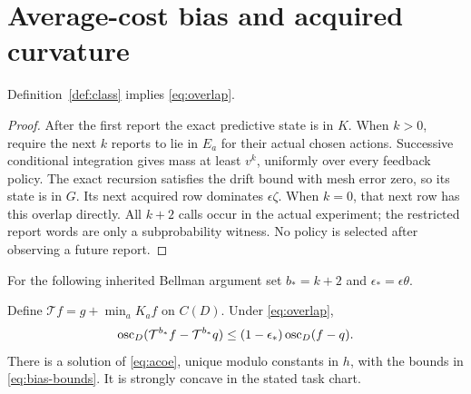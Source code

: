 \section{Average-cost bias and acquired curvature}\label{sec:bellman}
\begin{lemma}\label{lem:feedback-overlap}
Definition~\ref{def:class} implies \eqref{eq:overlap}.
\end{lemma}
\begin{proof}
After the first report the exact predictive state is in $K$. When $k>0$, require the next $k$ reports to lie in $E_a$ for their actual chosen actions. Successive conditional integration gives mass at least $v^k$, uniformly over every feedback policy. The exact recursion satisfies the drift bound with mesh error zero, so its state is in $G$. Its next acquired row dominates $\epsilon\zeta$. When $k=0$, that next row has this overlap directly. All $k+2$ calls occur in the actual experiment; the restricted report words are only a subprobability witness. No policy is selected after observing a future report.
\end{proof}
For the following inherited Bellman argument set $b_*=k+2$ and $\epsilon_*=\epsilon\theta$.
\begin{lemma}\label{lem:span}
Define $\mathcal T f=g+\min_aK_af$ on $C(D)$. Under \eqref{eq:overlap},
\[
 \operatorname{osc}_D(\mathcal T^{b_*}f-\mathcal T^{b_*}q)
 \le(1-\epsilon_*)\operatorname{osc}_D(f-q).
\]
There is a solution of \eqref{eq:acoe}, unique modulo constants in $h$, with the bounds in \eqref{eq:bias-bounds}. It is strongly concave in the stated task chart.
\end{lemma}
